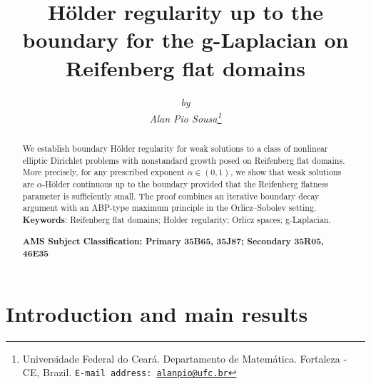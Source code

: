 \documentclass[11pt, leqno]{article}
\title{\Large{\bf Hölder regularity up to the boundary for the g-Laplacian on Reifenberg flat domains}}
\author{\it by \smallskip \\ 
Alan Pio Sousa\footnote{\noindent Universidade Federal do Cear\'{a}. Departamento de Matem\'atica. Fortaleza - CE, Brazil. \noindent \texttt{E-mail address: \url{alanpio@ufc.br}}}
}
\theoremstyle{definition}
\theoremstyle{remark}
\numberwithin{equation}{section}
\begin{document}
\maketitle
	
\begin{abstract}
\noindent We establish boundary Hölder regularity for weak solutions to a class of nonlinear elliptic Dirichlet problems with nonstandard growth  posed on Reifenberg flat domains. More precisely, for any prescribed exponent \(\alpha\in(0,1)\), we show that weak solutions are \(\alpha\)-Hölder continuous up to the boundary provided that the Reifenberg flatness parameter is sufficiently small. The proof combines an iterative boundary decay argument with an ABP-type maximum principle in the Orlicz--Sobolev setting.
\medskip
\noindent\\ \textbf{Keywords}: Reifenberg flat domains; Holder regularity; Orlicz spaces; g-Laplacian.

\vspace{0.2cm}
\noindent\textbf{AMS Subject Classification: Primary 35B65, 35J87; Secondary 35R05, 46E35}
\end{abstract}


	
\section{Introduction and main results}
	
\end{document}
